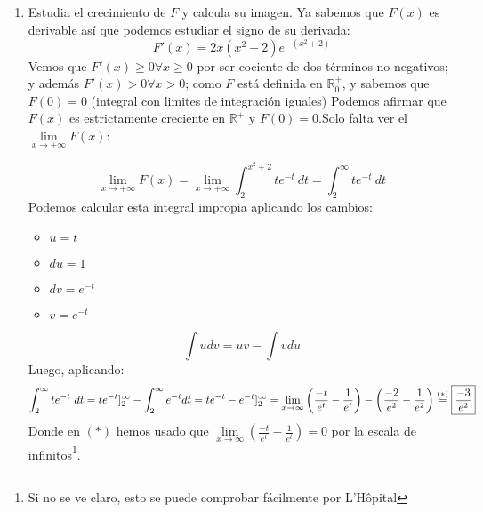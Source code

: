 \documentclass[12pt]{article}
\begin{document}
\begin{ejercicio}
\begin{enumerate}[label=\alph*)]
            \item Estudia el crecimiento de $F$ y calcula su imagen.
            \newline
            Ya sabemos que $F(x)$ es derivable así que podemos estudiar el signo de su derivada:
            $$F'(x) = 2x(x^2+2)e^{-(x^2+2)}$$
            Vemos que $F'(x)\geq 0 \forall x \geq 0 $ por ser cociente de dos términos no negativos; y además $F'(x) > 0 \forall x >0$; como $F$ está definida en $\mathbb{R}_0^+$, y sabemos que $F(0) = 0$ (integral con limites de integración iguales) Podemos afirmar que $F(x)$ es estrictamente creciente en $\mathbb{R}^+$ y $F(0)=0$.\newline Solo falta ver el $\lim\limits_{x\to+\infty} F(x)$:

            $$\lim\limits_{x\to+\infty} F(x) = \lim\limits_{x\to+\infty} \int_{2}^{x^2+2} te^{-t}~dt = \int_{2}^{\infty} te^{-t}~dt$$
            Podemos calcular esta integral impropia aplicando los cambios:
            \begin{itemize}
                \item $u=t$
                \item $du=1$
                \item $dv=e^{-t}$
                \item $v=e^{-t}$
            \end{itemize}
            $$\int udv = uv-\int vdu$$
            Luego, aplicando:
            $$\int_{2}^{\infty} te^{-t}~dt = te^{-t}]_2^\infty - \int_{2}^{\infty} e^{-t}dt =te^{-t}-e^{-t}]_2^\infty =\lim\limits_{x\to\infty}\left(\frac{-t}{e^t}-\frac1{e^t}\right)-\left(\frac{-2}{e^2}-\frac1{e^2}\right) \stackrel{(\ast)}{=} \boxed{\frac{-3}{e^2}}$$
            Donde en $(\ast)$ hemos usado que $\lim\limits_{x\to\infty}(\frac{-t}{e^t}-\frac1{e^t}) = 0$ por la escala de infinitos\footnote{Si no se ve claro, esto se puede comprobar fácilmente por L'Hôpital}.\\
            \centering\fbox{En conclusión $Im(F) = [0,+\infty[$}
                        
        \end{enumerate}
    \end{ejercicio}

    
\end{document}
